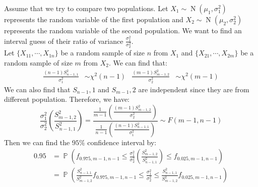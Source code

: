 \documentclass{huhtakm-template-book-v2}
\DeclareMathOperator{\prob}{\mathbb{P}}
\DeclareMathOperator{\N}{N}
\begin{document}
\newpage
\begin{eg}
	Assume that we try to compare two populations. Let $X_{1}\sim\N(\mu_{1},\sigma_{1}^{2})$ represents the random variable of the first population and $X_{2}\sim\N(\mu_{2},\sigma_{2}^{2})$ represents the random variable of the second population. We want to find an interval guess of their ratio of variance $\frac{\sigma_{1}^{2}}{\sigma_{2}^{2}}$.\\
	Let $\{X_{11},\cdots,X_{1n}\}$ be a random sample of size $n$ from $X_{1}$ and $\{X_{21},\cdots,X_{2m}\}$ be a random sample of size $m$ from $X_{2}$. We can find that:
	\begin{align*}
		\frac{(n-1)S_{n-1,1}^{2}}{\sigma_{1}^{2}}&\sim\chi^{2}(n-1) & \frac{(m-1)S_{m-1,2}^{2}}{\sigma_{2}^{2}}&\sim\chi^{2}(m-1)
	\end{align*}
	We can also find that $S_{n-1},1$ and $S_{m-1},2$ are independent since they are from different population. Therefore, we have:
	\begin{equation*}
		\frac{\sigma_{1}^{2}}{\sigma_{2}^{2}}\left(\frac{S_{m-1,2}^{2}}{S_{n-1,1}^{2}}\right)=\frac{\frac{1}{m-1}\left(\frac{(m-1)S_{m-1,2}^{2}}{\sigma_{2}^{2}}\right)}{\frac{1}{n-1}\left(\frac{(n-1)S_{n-1,1}^{2}}{\sigma_{1}^{2}}\right)}\sim F(m-1,n-1)
	\end{equation*}
	Then we can find the $95\%$ confidence interval by:
	\begin{align*}
		0.95&=\prob\left(f_{0.975,m-1,n-1}\leq\frac{\sigma_{1}^{2}}{\sigma_{2}^{2}}\left(\frac{S_{m-1,2}^{2}}{S_{n-1,1}^{2}}\right)\leq f_{0.025,m-1,n-1}\right)\\
		&=\prob\left(\frac{S_{n-1,1}^{2}}{S_{m-1,2}^{2}}f_{0.975,m-1,n-1}\leq\frac{\sigma_{1}^{2}}{\sigma_{2}^{2}}\leq \frac{S_{n-1,1}^{2}}{S_{m-1,2}^{2}}f_{0.025,m-1,n-1}\right)
	\end{align*}
\end{eg}
\end{document}
